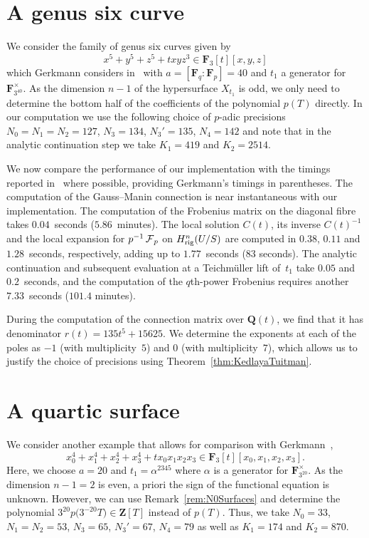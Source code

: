 \section{A genus six curve}

We consider the family of genus six curves given by 
\begin{equation*}
x^5 + y^5 + z^5 + t x y z^3 \in \mathbf{F}_3[t][x,y,z]
\end{equation*}
which Gerkmann considers in~\citep[\S 7.4]{Gerkmann2007} with 
$a = [\mathbf{F}_q : \mathbf{F}_p] = 40$ and $t_1$ a 
generator for~$\mathbf{F}_{3^{40}}^{\times}$.  As the dimension 
$n - 1$ of the hypersurface $X_{t_1}$ is odd, we only need to 
determine the bottom half of the coefficients of the polynomial 
$p(T)$ directly.  In our computation we use the following choice of 
$p$-adic precisions $N_0 = N_1 = N_2 = 127$, $N_3 = 134$, $N_3' = 135$, 
$N_4 = 142$ and note that in the analytic continuation step we 
take $K_1 = 419$ and $K_2 = 2514$.

We now compare the performance of our implementation with the 
timings reported in~\citep[\S 7.4]{Gerkmann2007} where possible, 
providing Gerkmann's timings in parentheses.  The computation of the 
Gauss--Manin connection is near instantaneous with our implementation.  
The computation of the Frobenius matrix on the diagonal fibre takes 
$0.04$~seconds ($5.86$~minutes).  The local solution $C(t)$, its 
inverse $C(t)^{-1}$ and the local expansion for $p^{-1} \operatorname{\mathcal{F}}_p$ on 
$H_{\text{rig}}^n(U/S)$ are computed in $0.38$, $0.11$ 
and $1.28$~seconds, respectively, adding up to $1.77$~seconds ($83$ seconds). 
The analytic continuation and subsequent evaluation at a Teichm\"uller lift 
of~$t_1$ take $0.05$ and $0.2$~seconds, and the computation of the $q$th-power 
Frobenius requires another $7.33$~seconds ($101.4$ minutes).

During the computation of the connection matrix over $\mathbf{Q}(t)$, 
we find that it has denominator $r(t) = 135 t^5 + 15625$.  We 
determine the exponents at each of the poles as $-1$ (with multiplicity~$5$) 
and $0$ (with multiplicity~$7$), which allows us to justify the choice 
of precisions using Theorem~\ref{thm:KedlayaTuitman}.

\section{A quartic surface}

We consider another example that allows for comparison with 
Gerkmann~\citep[\S 7.5]{Gerkmann2007},
\begin{equation*}
x_0^4 + x_1^4 + x_2^4 + x_3^4 + t x_0 x_1 x_2 x_3 \in \mathbf{F}_3[t][x_0,x_1,x_2,x_3].
\end{equation*}
Here, we choose $a = 20$ and $t_1 = \alpha^{2345}$ where 
$\alpha$ is a generator for $\mathbf{F}_{3^{20}}^{\times}$. 
As the dimension $n - 1 = 2$ is even, a priori the sign of the 
functional equation is unknown.  However, we can use 
Remark~\ref{rem:N0Surfaces} and determine the polynomial 
$3^{20} p\bigl(3^{-20} T\bigr) \in \mathbf{Z}[T]$ instead of $p(T)$. 
Thus, we take $N_0 = 33$, $N_1 = N_2 = 53$, $N_3 = 65$, 
$N_3' = 67$, $N_4 = 79$ as well as $K_1 = 174$ and $K_2 = 870$.

